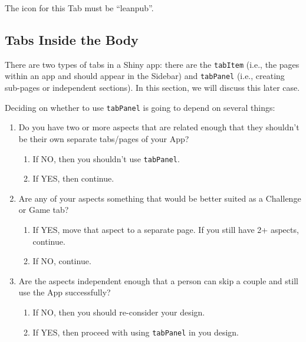 \documentclass[
]{book}
\providecommand{\tightlist}{%
  \setlength{\itemsep}{0pt}\setlength{\parskip}{0pt}}
\begin{document}
The icon for this Tab must be ``leanpub''.

\hypertarget{tabs-inside-the-body}{%
\subsection{Tabs Inside the Body}\label{tabs-inside-the-body}}

There are two types of tabs in a Shiny app: there are the \texttt{tabItem} (i.e., the pages within an app and should appear in the Sidebar) and \texttt{tabPanel} (i.e., creating sub-pages or independent sections). In this section, we will discuss this later case.

Deciding on whether to use \texttt{tabPanel} is going to depend on several things:

\begin{enumerate}
\def\labelenumi{\arabic{enumi}.}
\tightlist
\item
  Do you have two or more aspects that are related enough that they shouldn't be their own separate tabs/pages of your App?

  \begin{enumerate}
  \def\labelenumii{\alph{enumii}.}
  \tightlist
  \item
    If NO, then you shouldn't use \texttt{tabPanel}.\\
  \item
    If YES, then continue.
  \end{enumerate}
\item
  Are any of your aspects something that would be better suited as a Challenge or Game tab?

  \begin{enumerate}
  \def\labelenumii{\alph{enumii}.}
  \tightlist
  \item
    If YES, move that aspect to a separate page. If you still have 2+ aspects, continue.\\
  \item
    If NO, continue.\\
  \end{enumerate}
\item
  Are the aspects independent enough that a person can skip a couple and still use the App successfully?

  \begin{enumerate}
  \def\labelenumii{\alph{enumii}.}
  \tightlist
  \item
    If NO, then you should re-consider your design.\\
  \item
    If YES, then proceed with using \texttt{tabPanel} in you design.
  \end{enumerate}
\end{enumerate}
\end{document}
